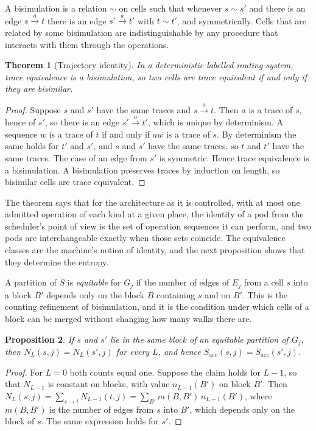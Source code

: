 \documentclass[11pt,openany]{book}
\theoremstyle{plain}
\newtheorem{theorem}{Theorem}[chapter]
\newtheorem{proposition}[theorem]{Proposition}
\theoremstyle{definition}
\theoremstyle{remark}
\newcommand{\Sacc}{S_{\mathrm{acc}}}
\begin{document}
A bisimulation is a relation $\sim$ on cells such that whenever $s\sim s'$ and there is an edge $s\xrightarrow{a}t$ there is an edge $s'\xrightarrow{a}t'$ with $t\sim t'$, and symmetrically. Cells that are related by some bisimulation are indistinguishable by any procedure that interacts with them through the operations.

\begin{theorem}[Trajectory identity]
\label{thm:identity}
In a deterministic labelled routing system, trace equivalence is a bisimulation, so two cells are trace equivalent if and only if they are bisimilar.
\end{theorem}
\begin{proof}
Suppose $s$ and $s'$ have the same traces and $s\xrightarrow{a}t$. Then $a$ is a trace of $s$, hence of $s'$, so there is an edge $s'\xrightarrow{a}t'$, which is unique by determinism. A sequence $w$ is a trace of $t$ if and only if $aw$ is a trace of $s$. By determinism the same holds for $t'$ and $s'$, and $s$ and $s'$ have the same traces, so $t$ and $t'$ have the same traces. The case of an edge from $s'$ is symmetric. Hence trace equivalence is a bisimulation. A bisimulation preserves traces by induction on length, so bisimilar cells are trace equivalent.
\end{proof}

The theorem says that for the architecture as it is controlled, with at most one admitted operation of each kind at a given place, the identity of a pod from the scheduler's point of view is the set of operation sequences it can perform, and two pods are interchangeable exactly when those sets coincide. The equivalence classes are the machine's notion of identity, and the next proposition shows that they determine the entropy.

A partition of $S$ is \emph{equitable} for $G_j$ if the number of edges of $E_j$ from a cell $s$ into a block $B'$ depends only on the block $B$ containing $s$ and on $B'$. This is the counting refinement of bisimulation, and it is the condition under which cells of a block can be merged without changing how many walks there are.

\begin{proposition}
\label{prop:equitable}
If $s$ and $s'$ lie in the same block of an equitable partition of $G_j$, then $N_L(s,j)=N_L(s',j)$ for every $L$, and hence $\Sacc(s,j)=\Sacc(s',j)$.
\end{proposition}
\begin{proof}
For $L=0$ both counts equal one. Suppose the claim holds for $L-1$, so that $N_{L-1}$ is constant on blocks, with value $n_{L-1}(B')$ on block $B'$. Then $N_L(s,j)=\sum_{s\to t}N_{L-1}(t,j)=\sum_{B'}m(B,B')\,n_{L-1}(B')$, where $m(B,B')$ is the number of edges from $s$ into $B'$, which depends only on the block of $s$. The same expression holds for $s'$.
\end{proof}
\end{document}
